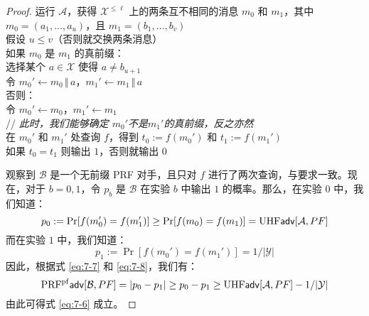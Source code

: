\begin{proof}
\hspace*{5pt} 运行 $\mathcal{A}$，获得 $\mathcal{X}^{\leq\ell}$ 上的两条互不相同的消息 $m_0$ 和 $m_1$，其中\\
\hspace*{50pt} $m_0=(a_1,\dots,a_u)$，且 $m_1=(b_1,\dots,b_v)$\\
\hspace*{26pt} 假设 $u\leq v$（否则就交换两条消息）\\
\hspace*{26pt} 如果 $m_0$ 是 $m_1$ 的真前缀：\\
\hspace*{50pt} 选择某个 $a\in\mathcal{X}$ 使得 $a\neq b_{u+1}$\\
\hspace*{50pt} 令 $m_0'\leftarrow m_0\,\Vert\,a$，$m_1'\leftarrow m_1\,\Vert\,a$\\
\hspace*{26pt} 否则：\\
\hspace*{50pt} 令 $m_0'\leftarrow m_0$，$m_1'\leftarrow m_1$\\
\hspace*{26pt} // \emph{此时，我们能够确定 $m_0'$不是$m_1'$的真前缀，反之亦然}\\
\hspace*{26pt} 在 $m_0'$ 和 $m_1'$ 处查询 $f$，得到 $t_0:=f(m_0')$ 和 $t_1:=f(m_1')$\\
\hspace*{26pt} 如果 $t_0=t_1$ 则输出 $1$，否则就输出 $0$

\vspace{5pt}

观察到 $\mathcal{B}$ 是一个无前缀 PRF 对手，且只对 $f$ 进行了两次查询，与要求一致。现在，对于 $b=0,1$，令 $p_b$ 是 $\mathcal{B}$ 在实验 $b$ 中输出 $1$ 的概率。那么，在实验 $0$ 中，我们知道：
\begin{equation}\label{eq:7-7}
p_0:=\Pr[f(m_0')=f(m_1')]\geq\Pr[f(m_0)=f(m_1)]={\rm UHF}\mathsf{adv}[\mathcal{A},PF]
\end{equation}
而在实验 $1$ 中，我们知道：
\begin{equation}\label{eq:7-8}
p_1:=\Pr[f(m_0')=f(m_1')]={1}/{|\mathcal{Y}|}
\end{equation}
因此，根据式 \ref{eq:7-7} 和 \ref{eq:7-8}，我们有：
\[
{\rm PRF^{pf}}\mathsf{adv}[\mathcal{B},PF]=|p_0-p_1|\geq p_0-p_1\geq{\rm UHF}\mathsf{adv}[\mathcal{A},PF]-{1}/{|\mathcal{Y}|}
\]
由此可得式 \ref{eq:7-6} 成立。
\end{proof}

